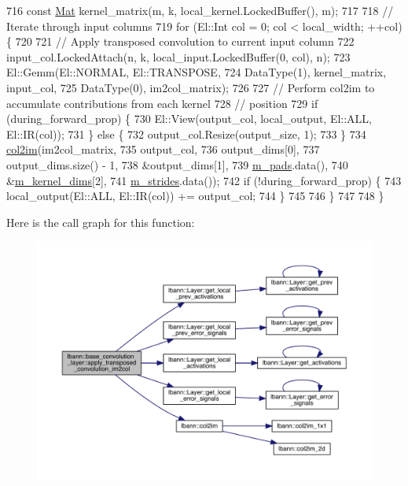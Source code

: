 \begin{DoxyCode}
716     \textcolor{keyword}{const} \hyperlink{base_8hpp_a68f11fdc31b62516cb310831bbe54d73}{Mat} kernel\_matrix(m, k, local\_kernel.LockedBuffer(), m);
717 
718     \textcolor{comment}{// Iterate through input columns}
719     \textcolor{keywordflow}{for} (El::Int col = 0; col < local\_width; ++col) \{
720 
721       \textcolor{comment}{// Apply transposed convolution to current input column}
722       input\_col.LockedAttach(n, k, local\_input.LockedBuffer(0, col), n);
723       El::Gemm(El::NORMAL, El::TRANSPOSE,
724                DataType(1), kernel\_matrix, input\_col,
725                DataType(0), im2col\_matrix);
726 
727       \textcolor{comment}{// Perform col2im to accumulate contributions from each kernel}
728       \textcolor{comment}{// position}
729       \textcolor{keywordflow}{if} (during\_forward\_prop) \{
730         El::View(output\_col, local\_output, El::ALL, El::IR(col));
731       \} \textcolor{keywordflow}{else} \{
732         output\_col.Resize(output\_size, 1);
733       \}
734       \hyperlink{namespacelbann_a0e1225f72580ffb5166181392b68b651}{col2im}(im2col\_matrix,
735              output\_col,
736              output\_dims[0],
737              output\_dims.size() - 1,
738              &output\_dims[1],
739              \hyperlink{classlbann_1_1base__convolution__layer_a9732a8a0170a413bf0cde0128ad2a571}{m\_pads}.data(),
740              &\hyperlink{classlbann_1_1base__convolution__layer_a283edb6a476f975e713d0b4235ac658f}{m\_kernel\_dims}[2],
741              \hyperlink{classlbann_1_1base__convolution__layer_a2429495822363e41f1f6b96a6b430445}{m\_strides}.data());
742       \textcolor{keywordflow}{if} (!during\_forward\_prop) \{
743         local\_output(El::ALL, El::IR(col)) += output\_col;
744       \}
745 
746     \}
747 
748   \}
\end{DoxyCode}
Here is the call graph for this function\+:\nopagebreak
\begin{figure}[H]
\begin{center}
\leavevmode
\includegraphics[width=350pt]{classlbann_1_1base__convolution__layer_a87fb2bf066a98052938e48a82dcd4fd2_cgraph}
\end{center}
\end{figure}
